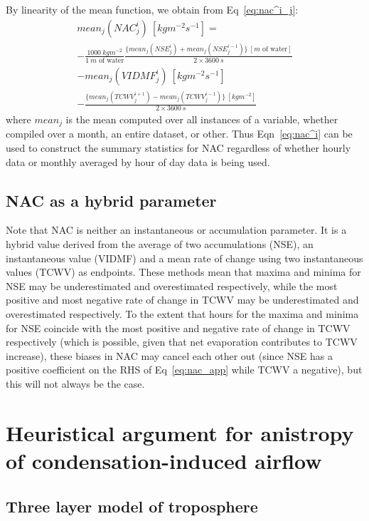 By linearity of the mean function, we obtain from Eq~\ref{eq:nac^i_j}:
\begin{eqnarray}
	\label{eq:nac^i}
	mean_j(NAC^i_j) \ [kg m^{-2} s^{-1}] = \\
	- \frac{1000 \ kg m^{-2}}{1 \ m \mbox{ of water}} \frac{\{mean_j(NSE^i_j) + mean_j(NSE^{i-1}_j)\} \ [m \mbox{ of water} ]}{2 \times 3600 \ s} \nonumber \\
	- mean_j(VIDMF^i_j) \ [kg m^{-2} s^{-1}] \nonumber \\ 
	- \frac{\{mean_j(TCWV^{i+1}_j) - mean_j(TCWV^{i-1}_j)\} \ [kg m^{-2}]}{2 \times 3600 \ s} \nonumber
\end{eqnarray}
where $mean_j$ is the mean computed over all instances of a variable, whether compiled over a month, an entire dataset, or other. Thus Eqn~\ref{eq:nac^i} can be used to construct the summary statistics for \ac{NAC} regardless of whether hourly data or monthly averaged by hour of day data is being used.

\subsection{NAC as a hybrid parameter}

Note that \ac{NAC} is neither an instantaneous or accumulation parameter. It is a hybrid value derived from the average of two accumulations (\ac{NSE}), an instantaneous value (\ac{VIDMF}) and a mean rate of change using two instantaneous values (\ac{TCWV}) as endpoints. These methods mean that maxima and minima for \ac{NSE} may be underestimated and overestimated respectively, while the most positive and most negative rate of change in \ac{TCWV} may be underestimated and overestimated respectively. To the extent that hours for the maxima and minima for \ac{NSE} coincide with the most positive and negative rate of change in \ac{TCWV} respectively (which is possible, given that net evaporation contributes to \ac{TCWV} increase), these biases in \ac{NAC} may cancel each other out (since \ac{NSE} has a positive coefficient on the RHS of Eq~\ref{eq:nac_app} while \ac{TCWV} a negative), but this will not always be the case.

\section[Anistropy of condensation-induced airflow]{Heuristical argument for anistropy of condensation-induced airflow}
\label{sec:anis_cond}

\subsection{Three layer model of troposphere}

